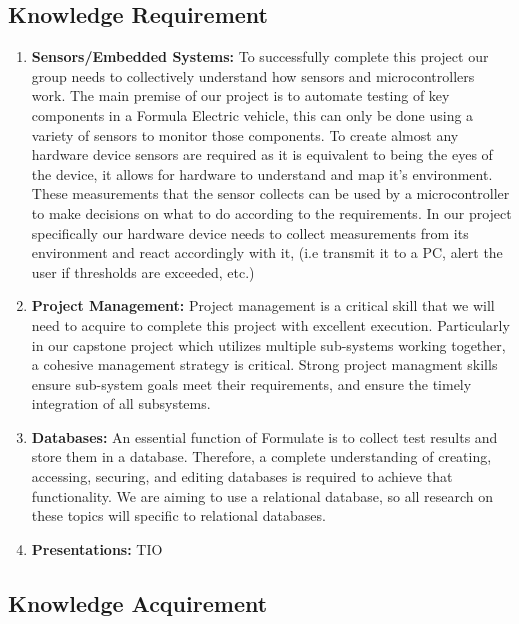 \documentclass[12pt]{article}
\begin{document}
\subsection{Knowledge Requirement}
\begin{enumerate}
  \item \textbf{Sensors/Embedded Systems:} To successfully complete this project our group needs to collectively understand how sensors and microcontrollers work. The main premise of our project is to automate testing of key components in a Formula Electric vehicle, this can only be done using a variety of sensors to monitor those components. To create almost any hardware device sensors are required as it is equivalent to being the eyes of the device, it allows for hardware to understand and map it's environment. These measurements that the sensor collects can be used by a microcontroller to make decisions on what to do according to the requirements. In our project specifically our hardware device needs to collect measurements from its environment and react accordingly with it, (i.e transmit it to a PC, alert the user if thresholds are exceeded, etc.)
  
  \item \textbf{Project Management:} Project management is a critical skill that we will need to acquire to complete this project with excellent execution. Particularly in our capstone project which utilizes multiple sub-systems working together, a cohesive management strategy is critical. Strong project managment skills ensure sub-system goals meet their requirements, and ensure the timely integration of all subsystems.
  
  \item \textbf{Databases:} An essential function of Formulate is to collect test results and store them in a database. Therefore, a complete understanding of creating, accessing, securing, and editing databases is required to achieve that functionality. We are aiming to use a relational database, so all research on these topics will specific to relational databases.
  
  \item \textbf{Presentations:} TIO
  
\end{enumerate}


\subsection{Knowledge Acquirement }
\end{document}
